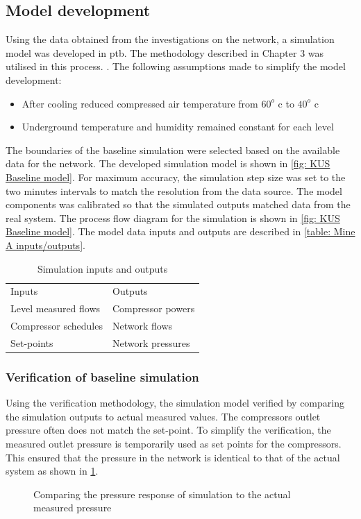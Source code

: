 \subsection{Model development}
	
Using the data obtained from the investigations on the network, a simulation model was developed in \gls{ptb}. The methodology described in Chapter 3 was utilised in this process. . The following assumptions made to simplify the model development:
\begin{itemize}
	\item After cooling reduced compressed air temperature from $ 60 ^o $ \gls{c} to $ 40 ^o $ \gls{c}
	\item Underground temperature and humidity remained constant for each level
\end{itemize}
 The boundaries of the baseline simulation were selected based on the available data for the network. The developed simulation model is shown in \cref{fig: KUS Baseline model}. For maximum accuracy, the simulation step size was set to the two minutes intervals to match the resolution from the data source.
The model components was calibrated so that the simulated outputs matched data from the real system. The process flow diagram for the simulation is shown in \cref{fig: KUS Baseline model}. The model data inputs and outputs are described in \cref{table: Mine A inputs/outputs}.

\begin{table}[h]
	\centering
	\begin{tabular}{ll}
		\hline 
		Inputs \hspace*{4cm}    &Outputs \hspace*{4cm}    \\  \hhline{==}
		Level measured flows&Compressor powers \\
		Compressor schedules& Network flows \\
		Set-points & Network pressures \\
		\hline
	\end{tabular}
		\caption{Simulation inputs and outputs}
\label{table: Mine B inputs/outputs}
\end{table}
	
	\subsubsection{Verification of baseline simulation}
	Using the verification methodology, the simulation model verified by comparing the simulation outputs to actual measured values. The compressors outlet pressure often does not match the set-point. To simplify the verification, the measured outlet pressure is temporarily used as set points for the compressors. This ensured that the pressure in the network is identical to that of the actual system as shown in \cref{fig: Verification Pressure kusasalethu}.
	\par 
	\begin{figure}[h]
		\centering
		
		\caption{Comparing the pressure response of simulation to the actual measured pressure}
		\label{fig: Verification Pressure kusasalethu}
	\end{figure}

